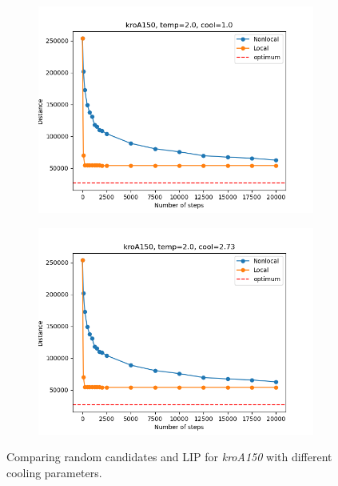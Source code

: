 \begin{figure}[!htb]
	\centering
	\begin{subfigure}{0.45\textwidth}
		\includegraphics[width=\textwidth]{img/kroA150_temp=2.0_cool=1.0}
	\end{subfigure}
	\begin{subfigure}{0.45\textwidth}
		\includegraphics[width=\textwidth]{img/kroA150_temp=2.0_cool=2.73}
	\end{subfigure}
	\caption{Comparing random candidates and LIP for \textit{kroA150} with different cooling parameters.}
	\label{fig:kroA150_comp}
\end{figure}

